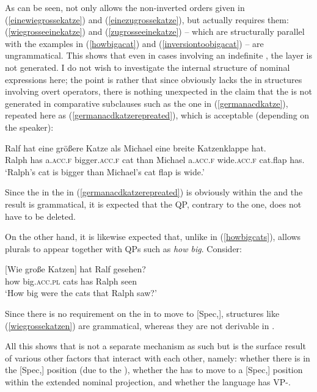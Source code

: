 As can be seen,  not only allows the non-inverted orders given in (\ref{einewiegrossekatze}) and (\ref{einezugrossekatze}), but actually requires them: (\ref{wiegrosseeinekatze}) and (\ref{zugrosseeinekatze}) -- which are structurally parallel with the  examples in (\ref{howbigacat}) and (\ref{inversiontoobigacat}) -- are ungrammatical. This shows that even in cases involving an indefinite , the  layer is not generated. I do not wish to investigate the internal structure of  nominal expressions here; the point is rather that since  obviously lacks the  in structures involving overt operators, there is nothing unexpected in the claim that the  is not generated in comparative subclauses such as the one in (\ref{germanacdkatze}), repeated here as (\ref{germanacdkatzerepreated}), which is acceptable (depending on the speaker):

\ea \gll	Ralf	hat	eine	größere	Katze	als Michael	eine breite Katzenklappe hat. \label{germanacdkatzerepreated}\\
Ralph	has	a.\textsc{acc.f} bigger.\textsc{acc.f} cat than Michael a.\textsc{acc.f} wide.\textsc{acc.f} cat.flap has.\\
\glt `Ralph's cat is bigger than Michael's cat flap is wide.'
\z

Since the  in the  in (\ref{germanacdkatzerepreated}) is obviously within the  and the result is grammatical, it is expected that the  QP, contrary to the  one, does not have to be deleted.

On the other hand, it is likewise expected that, unlike  in (\ref{howbigcats}),  allows plurals to appear together with QPs such as \textit{how big}. Consider:

\ea \gll	{}[Wie	große	Katzen]	hat	Ralf gesehen? \label{wiegrossekatzen}\\
\phantom{[}how	big.\textsc{acc.pl}	cats has Ralph seen\\
\glt `How big were the cats that Ralph saw?'
\z

Since there is no requirement on the  in  to move to [Spec,], structures like (\ref{wiegrossekatzen}) are grammatical, whereas they are not derivable in .

All this shows that  is not a separate mechanism as such but is the surface result of various other factors that interact with each other, namely: whether there is  in the [Spec,] position (due to the ), whether the  has to move to a [Spec,] position within the extended nominal projection, and whether the language has VP-.
